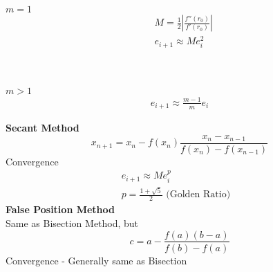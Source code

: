 \documentclass[10pt]{article}
\begin{document}
\begin{multicols}{2}
\begin{minipage}{\columnwidth}
\begin{flushright}
            \begin{multicols}{2}
                \begin{minipage}{1in}
                    \(m = 1\)
                    \begin{equation*}
                        \begin{aligned}
                             & M = \frac{1}{2} \left| \frac{f''(r_0)}{f'(r_0)} \right| \\
                             & e_{i+1} \approx Me_i^2                                  \\
                        \end{aligned}
                    \end{equation*}
                \end{minipage} \\
                \begin{minipage}{1in}
                    \(m > 1\)
                    \begin{equation*}
                        \begin{aligned}
                            e_{i+1} \approx \frac{m-1}{m} e_i
                        \end{aligned}
                    \end{equation*}
                \end{minipage}
            \end{multicols}
            \textbf{Secant Method}
            \begin{equation*}
                x_{n+1} = x_n - f(x_n)\frac{x_n - x_{n-1}}{f(x_n) - f(x_{n-1})}
            \end{equation*}
            Convergence
            \begin{equation*}
                \begin{aligned}
                    e_{i+1} \approx Me_i^p                            & \\
                    p = \frac{1 + \sqrt{5}}{2} \text{ (Golden Ratio)} &
                \end{aligned}
            \end{equation*}
            \textbf{False Position Method} \\
            Same as Bisection Method, but
            \begin{equation*}
                c = a - \frac{f(a) (b-a)}{f(b) - f(a)}
            \end{equation*}
            Convergence - Generally same as Bisection \\

\end{flushright}
\end{minipage}
\end{multicols}
\end{document}
